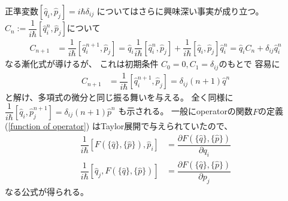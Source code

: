 正準変数$[\hat{q}_i, \hat{p}_j] = i\hbar\delta_{ij}$
についてはさらに興味深い事実が成り立つ。
$C_n := \dfrac{1}{i\hbar} [\hat{q}^n_i, \hat{p}_j]$について
\begin{align}
    C_{n+1}
    &=
    \dfrac{1}{i\hbar}
    [\hat{q}^{n+1}_i, \hat{p}_j]
    =
    \hat{q}_i 
    \dfrac{1}{i\hbar}
    [\hat{q}_i^n, \hat{p}_j]
    +
    \dfrac{1}{i\hbar}
    [\hat{q}_i, \hat{p}_j] \hat{q}_i^n
    =
    \hat{q}_i C_n
    +
    \delta_{ij} \hat{q}_i^n
\end{align}
なる漸化式が導けるが、
これは初期条件
$C_0  = 0, C_1 = \delta_{ij}$のもとで
容易に
\begin{align}
    C_{n+1} &= 
    \dfrac{1}{i\hbar}
    [\hat{q}^{n+1}_i, \hat{p}_j]
    = \delta_{ij} (n+1) \hat{q}^n
\label{differential by commutator}
\end{align}
と解け、多項式の微分と同じ振る舞いを与える。
全く同様に
$\dfrac{1}{i\hbar}
[\hat{q}_i, \hat{p}^{n+1}_j]
= \delta_{ij} (n+1) \hat{p}^n$
も示される。
一般にoperatorの関数$F$の定義
(\ref{function of operator})
はTaylor展開で与えられていたので、
\begin{align}
    \dfrac{1}{i\hbar}
    [F(\{ \hat{q} \},\{ \hat{p} \}), \hat{p}_i]
    &=
    \dfrac{
        \partial F(\{ \hat{q} \},\{ \hat{p} \})
    }{
        \partial q_i
    }
\\
    \dfrac{1}{i\hbar}
    [\hat{q}_j, F(\{ \hat{q} \},\{ \hat{p} \})]
    &=
    \dfrac{
        \partial F(\{ \hat{q} \},\{ \hat{p} \})
    }{
        \partial p_j
    }
\end{align}
なる公式が得られる。


